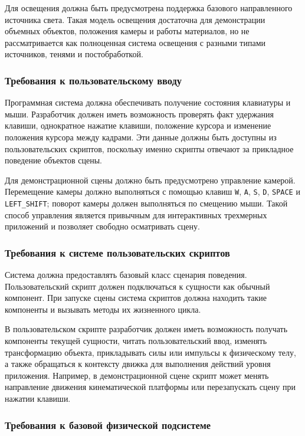 Для освещения должна быть предусмотрена поддержка базового направленного источника света. Такая модель освещения достаточна для демонстрации объемных объектов, положения камеры и работы материалов, но не рассматривается как полноценная система освещения с разными типами источников, тенями и постобработкой.

\subsubsection{Требования к пользовательскому вводу}

Программная система должна обеспечивать получение состояния клавиатуры и мыши. Разработчик должен иметь возможность проверять факт удержания клавиши, однократное нажатие клавиши, положение курсора и изменение положения курсора между кадрами. Эти данные должны быть доступны из пользовательских скриптов, поскольку именно скрипты отвечают за прикладное поведение объектов сцены.

Для демонстрационной сцены должно быть предусмотрено управление камерой. Перемещение камеры должно выполняться с помощью клавиш \texttt{W}, \texttt{A}, \texttt{S}, \texttt{D}, \texttt{SPACE} и \texttt{LEFT\_SHIFT}; поворот камеры должен выполняться по смещению мыши. Такой способ управления является привычным для интерактивных трехмерных приложений и позволяет свободно осматривать сцену.

\subsubsection{Требования к системе пользовательских скриптов}

Система должна предоставлять базовый класс сценария поведения. Пользовательский скрипт должен подключаться к сущности как обычный компонент. При запуске сцены система скриптов должна находить такие компоненты и вызывать методы их жизненного цикла.

В пользовательском скрипте разработчик должен иметь возможность получать компоненты текущей сущности, читать пользовательский ввод, изменять трансформацию объекта, прикладывать силы или импульсы к физическому телу, а также обращаться к контексту движка для выполнения действий уровня приложения. Например, в демонстрационной сцене скрипт может менять направление движения кинематической платформы или перезапускать сцену при нажатии клавиши.

\subsubsection{Требования к базовой физической подсистеме}

